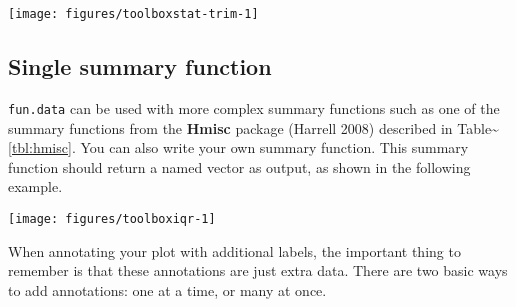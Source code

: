 \begin{flushleft}\texttt{[image: figures/toolboxstat-trim-1]} \end{flushleft}

\subsection{Single summary function}

\texttt{fun.data} can be used with more complex summary functions such
as one of the summary functions from the \textbf{Hmisc} package (Harrell
2008) described in Table\textasciitilde{}\ref{tbl:hmisc}. You can also
write your own summary function. This summary function should return a
named vector as output, as shown in the following example.

\begin{Shaded}
\begin{Highlighting}[]
\NormalTok{>}\StringTok{ }\StringTok{ }
\NormalTok{+}\StringTok{   }\StringTok{ }\NormalTok{(}\NormalTok{(}\NormalTok{, }\NormalTok{), } 
\NormalTok{+}\StringTok{   }\StringTok{ }\NormalTok{(}\NormalTok{, }\NormalTok{)}
\NormalTok{+}\StringTok{   }
\NormalTok{+}\StringTok{ }\NormalTok{\}}
\NormalTok{>}\StringTok{ }\StringTok{ }\NormalTok{(} \NormalTok{, }\NormalTok{)}
\end{Highlighting}
\end{Shaded}

\begin{flushleft}\texttt{[image: figures/toolboxiqr-1]} \end{flushleft}


When annotating your plot with additional labels, the important thing to
remember is that these annotations are just extra data. There are two
basic ways to add annotations: one at a time, or many at once.

